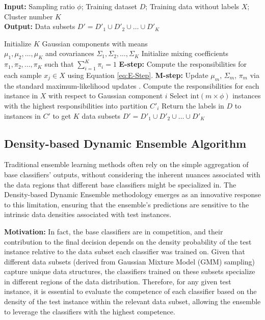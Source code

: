 \documentclass[lettersize,journal]{IEEEtran}
\begin{document}
	\begin{algorithm}[!t]
		\caption{GMM Sampling}
		\label{algo:gmm}
		\textbf{Input:} Sampling ratio $\phi$; Training dataset $D$; Training data without labels $X$; Cluster number $K$ \\
		\textbf{Output:} Data subsets $D' = D'_1 \cup D'_2 \cup \dots \cup D'_K$
		\begin{algorithmic}[1]
			\State Initialize $K$ Gaussian components with means \\
			$\mu_1, \mu_2, \dots, \mu_K$ and covariances $\Sigma_1, \Sigma_2, \dots, \Sigma_K$
			\State Initialize mixing coefficients $\pi_1, \pi_2, \dots, \pi_K$ such that $\sum_{i=1}^{K} \pi_i = 1$
			\Repeat
			\State \textbf{E-step:} Compute the responsibilities for each sample $x_j \in X$ using Equation \ref{eq:E-Step}.
			\State \textbf{M-step:} Update $\mu_m$, $\Sigma_m$, $\pi_m$ via the standard maximum-likelihood updates \cite{dempster_maximum_1977}.
			\State Compute the responsibilities for each instance in $X$ with respect to Gaussian component $i$
			\State Select $\text{int}(m \times \phi)$ instances with the highest responsibilities into partition $C'_i$
			\EndFor
			\State Return the labels in $D$ to instances in $C'$ to get $K$ data subsets $D' = D'_1 \cup D'_2 \cup \dots \cup D'_K$
			\EndProcedure
		\end{algorithmic}
	\end{algorithm}
	
	\subsection{Density-based Dynamic Ensemble Algorithm}
	\noindent Traditional ensemble learning methods often rely on the simple aggregation of base classifiers’ outputs, without considering the inherent nuances
	associated with the data regions that different base classifiers might be specialized in. The Density-based Dynamic Ensemble methodology emerges
	as an innovative response to this limitation, ensuring that the ensemble’s
	predictions are sensitive to the intrinsic data densities associated with test
	instances.
	
	\textbf{Motivation:} In fact, the base classifiers are in competition, and their contribution to the final decision depends on the density probability of the test instance relative to the data subset each classifier was trained on. Given that different data subsets (derived from Gaussian Mixture Model (GMM) sampling) capture unique data structures, the classifiers trained on these subsets specialize in different regions of the data distribution. Therefore, for any given test instance, it is essential to evaluate the competence of each classifier based on the density of the test instance within the relevant data subset, allowing the ensemble to leverage the classifiers with the highest competence.
	
\end{document}
